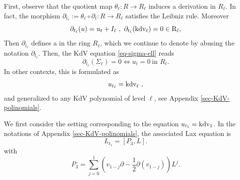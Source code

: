 \documentclass[a4paper,12pt]{article}
\def\kdv{\rm kdv}
\begin{document}
First, observe that the quotient map $\theta_\ell : R\rightarrow  R_\ell $ induces a derivation in $R_\ell$. In fact, the morphism $\partial_{t_\ell } := \theta_\ell \circ\partial_t : R \rightarrow R_\ell$ satisfies the Leibniz rule. Moreover
\begin{equation}
    \partial_{t_\ell } (u) = u_t +I_\ell \ , \ \partial_{t_\ell }(\kdv_\ell ) =0\in R_\ell ,
\end{equation}
Then $\partial_{t_\ell }$ defines a  in the ring $R_\ell$, which we continue to denote by abusing the notation $\partial_{t_\ell }$. Then, the KdV equation \eqref{eq-sigma-ell} reads
\begin{equation}
    \partial_{t_\ell } (\Sigma_\ell )=0 \Longleftrightarrow u_t =0 \ \textrm{in } R_\ell.
\end{equation}
In other contexts,  this is formulated as
\begin{equation}%
u_{t_\ell } = \kdv_\ell \ ,    
\end{equation}
and generalized to any KdV polynomial of level $\ell$, see Appendix \ref{sec-KdV-polinomials}. 


We first consider the setting corresponding to the equation $u_{t_1 } = \kdv_1$. In the notations of  Appendix \ref{sec-KdV-polinomials}, the associated Lax equation is
{\begin{equation}\label{eq:Lax-kdv-l+1}
   L_{t_1 } = [ P_3  , L].
\end{equation}}
with 
\begin{equation}%
P_{3}=\sum_{j=0}^1 \left(v_{1-j}\partial-\frac{1}{2}\partial(v_{1-j})\right)L^j.
\end{equation}
\end{document}
